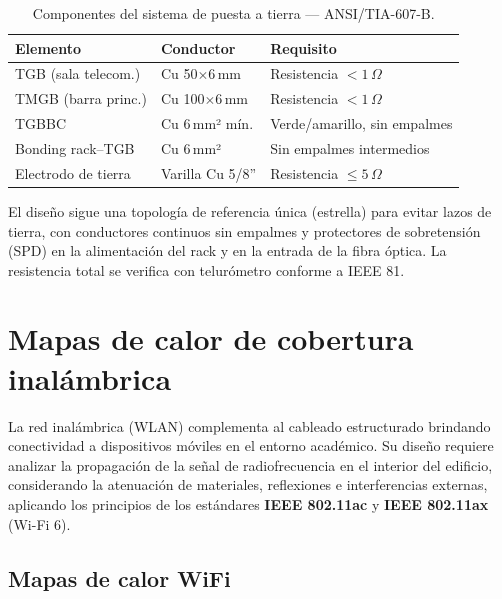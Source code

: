 \begin{table}[H]
    \centering
    \caption{Componentes del sistema de puesta a tierra — ANSI/TIA-607-B.}
    \label{tab:tierra}
    \begin{tabular}{|p{4.5cm}|p{3cm}|p{5.5cm}|}
        \hline
        \textbf{Elemento} & \textbf{Conductor} & \textbf{Requisito} \\
        \hline
        TGB (sala telecom.)  & Cu 50$\times$6\,mm   & Resistencia $< 1\,\Omega$ \\
        \hline
        TMGB (barra princ.)  & Cu 100$\times$6\,mm  & Resistencia $< 1\,\Omega$ \\
        \hline
        TGBBC                & Cu 6\,mm² mín.       & Verde/amarillo, sin empalmes \\
        \hline
        Bonding rack--TGB    & Cu 6\,mm²            & Sin empalmes intermedios \\
        \hline
        Electrodo de tierra  & Varilla Cu 5/8''     & Resistencia $\leq 5\,\Omega$ \\
        \hline
    \end{tabular}
\end{table}

El diseño sigue una topología de referencia única (estrella) para evitar lazos de
tierra, con conductores continuos sin empalmes y protectores de sobretensión (SPD)
en la alimentación del rack y en la entrada de la fibra óptica. La resistencia total
se verifica con telurómetro conforme a IEEE 81.

\section{Mapas de calor de cobertura inalámbrica}
\label{sec:mapas_calor}

La red inalámbrica (WLAN) complementa al cableado estructurado brindando
conectividad a dispositivos móviles en el entorno académico. Su diseño requiere
analizar la propagación de la señal de radiofrecuencia en el interior del edificio,
considerando la atenuación de materiales, reflexiones e interferencias externas,
aplicando los principios de los estándares \textbf{IEEE 802.11ac} y
\textbf{IEEE 802.11ax} (Wi-Fi 6).

\subsection{Mapas de calor WiFi}


